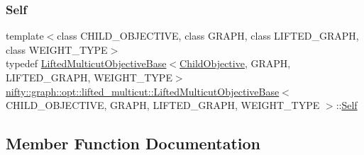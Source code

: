 \subsubsection{\texorpdfstring{Self}{Self}}
{\footnotesize\ttfamily template$<$class C\+H\+I\+L\+D\+\_\+\+O\+B\+J\+E\+C\+T\+I\+VE, class G\+R\+A\+PH, class L\+I\+F\+T\+E\+D\+\_\+\+G\+R\+A\+PH, class W\+E\+I\+G\+H\+T\+\_\+\+T\+Y\+PE$>$ \\
typedef \hyperlink{classnifty_1_1graph_1_1opt_1_1lifted__multicut_1_1LiftedMulticutObjectiveBase}{Lifted\+Multicut\+Objective\+Base}$<$\hyperlink{classnifty_1_1graph_1_1opt_1_1lifted__multicut_1_1LiftedMulticutObjectiveBase_a9528ca24d93bf9dc7fd156993588d9fc}{Child\+Objective}, G\+R\+A\+PH, L\+I\+F\+T\+E\+D\+\_\+\+G\+R\+A\+PH, W\+E\+I\+G\+H\+T\+\_\+\+T\+Y\+PE$>$ \hyperlink{classnifty_1_1graph_1_1opt_1_1lifted__multicut_1_1LiftedMulticutObjectiveBase}{nifty\+::graph\+::opt\+::lifted\+\_\+multicut\+::\+Lifted\+Multicut\+Objective\+Base}$<$ C\+H\+I\+L\+D\+\_\+\+O\+B\+J\+E\+C\+T\+I\+VE, G\+R\+A\+PH, L\+I\+F\+T\+E\+D\+\_\+\+G\+R\+A\+PH, W\+E\+I\+G\+H\+T\+\_\+\+T\+Y\+PE $>$\+::\hyperlink{classnifty_1_1graph_1_1opt_1_1lifted__multicut_1_1LiftedMulticutObjectiveBase_a415ea8a76d9a7c8a6ba833e8fa1a7d78}{Self}}



\subsection{Member Function Documentation}
\mbox{\label{classnifty_1_1graph_1_1opt_1_1lifted__multicut_1_1LiftedMulticutObjectiveBase_a04477c5ef3569c1b4123a28fb35013b0}} 
